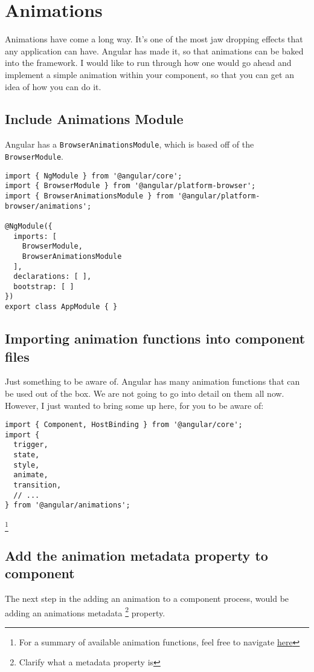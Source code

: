 
\chapter{ Animations }

Animations have come a long way. It's one of the most jaw dropping effects
that any application can have. Angular has made it, so that animations can be
baked into the framework. I would like to run through how one would go ahead
and implement a simple animation within your component, so that you can get an 
idea of how you can do it. 

\section{ Include Animations Module }
Angular has a \lstinline{BrowserAnimationsModule}, which is based off of the 
\lstinline{BrowserModule}.

\begin{lstlisting}[caption=app.module.ts]
import { NgModule } from '@angular/core';
import { BrowserModule } from '@angular/platform-browser';
import { BrowserAnimationsModule } from '@angular/platform-browser/animations';

@NgModule({
  imports: [
    BrowserModule,
    BrowserAnimationsModule
  ],
  declarations: [ ],
  bootstrap: [ ]
})
export class AppModule { }  
\end{lstlisting}

\section{ Importing animation functions into component files }
Just something to be aware of. Angular has many animation functions that can
be used out of the box. We are not going to go into detail on them all now. 
However, I just wanted to bring some up here, for you to be aware of: 
\begin{lstlisting}[caption=app.component.ts]
import { Component, HostBinding } from '@angular/core';
import {
  trigger,
  state,
  style,
  animate,
  transition,
  // ...
} from '@angular/animations';  
\end{lstlisting}

\footnote{For a summary of available animation functions, feel free to navigate 
\href{https://angular.io/guide/animations\#animation-api-summary}{here}}

\section{Add the animation metadata property to component}
The next step in the adding an animation to a component process, would be 
adding an animations metadata \footnote{Clarify what a metadata property is}
property.

